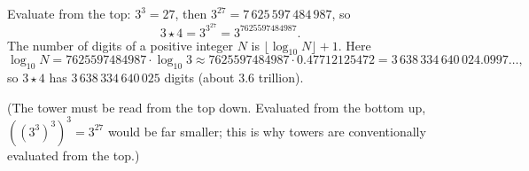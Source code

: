 Evaluate from the top: $3^3=27$, then $3^{27}=7\,625\,597\,484\,987$, so
\[
3\star4=3^{3^{27}}=\boxed{3^{7625597484987}}.
\]
The number of digits of a positive integer $N$ is $\lfloor\log_{10}N\rfloor+1$. Here
\[
\log_{10}N=7625597484987\cdot\log_{10}3\approx7625597484987\cdot0.47712125472=3\,638\,334\,640\,024.0997\ldots,
\]
so $3\star4$ has $\boxed{3\,638\,334\,640\,025}$ digits (about $3.6$ trillion).

(The tower must be read from the top down. Evaluated from the bottom up, $\left(\left(3^3\right)^3\right)^3=3^{27}$ would be far smaller; this is why towers are conventionally evaluated from the top.)
